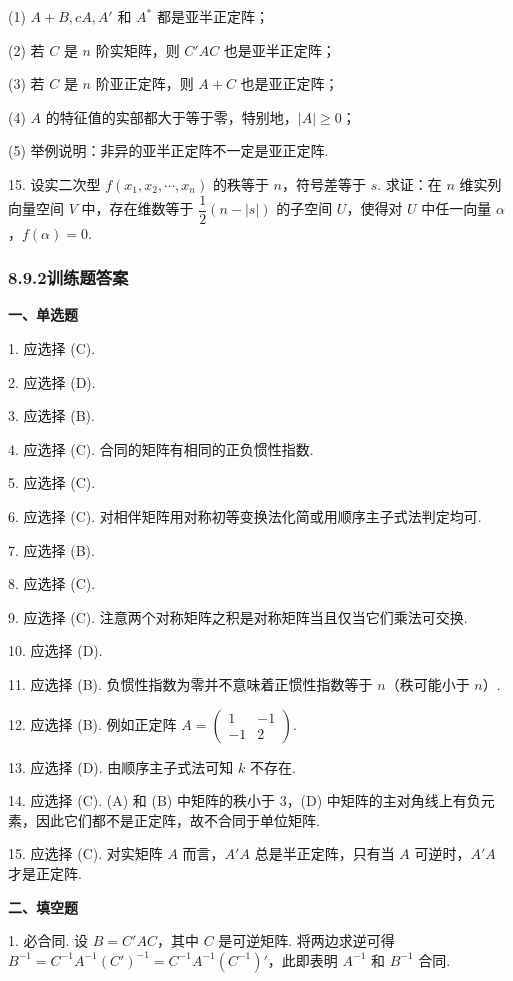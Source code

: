 \documentclass[UTF8, 12pt, fontset=fandol, oneside]{ctexart}
\begin{document}
(1) $A+B,cA,A'$ 和 $A^*$ 都是亚半正定阵；

(2) 若 $C$ 是 $n$ 阶实矩阵，则 $C'AC$ 也是亚半正定阵；

(3) 若 $C$ 是 $n$ 阶亚正定阵，则 $A+C$ 也是亚正定阵；

(4) $A$ 的特征值的实部都大于等于零，特别地，$|A|\ge 0$；

(5) 举例说明：非异的亚半正定阵不一定是亚正定阵.

15. 设实二次型 $f(x_1,x_2,\cdots,x_n)$ 的秩等于 $n$，符号差等于 $s$. 求证：在 $n$ 维实列向量空间 $V$ 中，存在维数等于 $\dfrac12(n-|s|)$ 的子空间 $U$，使得对 $U$ 中任一向量 $\alpha$，$f(\alpha)=0$.

\subsubsection*{8.9.2\quad 训练题答案}

\noindent\textbf{一、单选题}

1. 应选择 (C).

2. 应选择 (D).

3. 应选择 (B).

4. 应选择 (C). 合同的矩阵有相同的正负惯性指数.

5. 应选择 (C).

6. 应选择 (C). 对相伴矩阵用对称初等变换法化简或用顺序主子式法判定均可.

7. 应选择 (B).

8. 应选择 (C).

9. 应选择 (C). 注意两个对称矩阵之积是对称矩阵当且仅当它们乘法可交换.

10. 应选择 (D).

11. 应选择 (B). 负惯性指数为零并不意味着正惯性指数等于 $n$（秩可能小于 $n$）.

12. 应选择 (B). 例如正定阵 $A=\left(\begin{array}{cc}1&-1\\ -1&2\end{array}\right)$.

13. 应选择 (D). 由顺序主子式法可知 $k$ 不存在.

14. 应选择 (C). (A) 和 (B) 中矩阵的秩小于 $3$，(D) 中矩阵的主对角线上有负元素，因此它们都不是正定阵，故不合同于单位矩阵.

15. 应选择 (C). 对实矩阵 $A$ 而言，$A'A$ 总是半正定阵，只有当 $A$ 可逆时，$A'A$ 才是正定阵.

\noindent\textbf{二、填空题}

1. 必合同. 设 $B=C'AC$，其中 $C$ 是可逆矩阵. 将两边求逆可得 $B^{-1}=C^{-1}A^{-1}(C')^{-1}=C^{-1}A^{-1}(C^{-1})'$，此即表明 $A^{-1}$ 和 $B^{-1}$ 合同.
\end{document}
